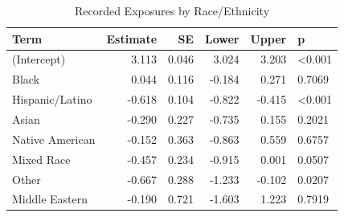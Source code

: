 \begin{table}

\caption{\label{tab:race_breaches}Recorded Exposures by Race/Ethnicity}
\centering
\begin{tabular}[t]{lrrrrl}
\toprule
Term & Estimate & SE & Lower & Upper & p\\
\midrule
(Intercept) & 3.113 & 0.046 & 3.024 & 3.203 & <0.001\\
Black & 0.044 & 0.116 & -0.184 & 0.271 & 0.7069\\
Hispanic/Latino & -0.618 & 0.104 & -0.822 & -0.415 & <0.001\\
Asian & -0.290 & 0.227 & -0.735 & 0.155 & 0.2021\\
Native American & -0.152 & 0.363 & -0.863 & 0.559 & 0.6757\\
\addlinespace
Mixed Race & -0.457 & 0.234 & -0.915 & 0.001 & 0.0507\\
Other & -0.667 & 0.288 & -1.233 & -0.102 & 0.0207\\
Middle Eastern & -0.190 & 0.721 & -1.603 & 1.223 & 0.7919\\
\bottomrule
\end{tabular}
\end{table}
